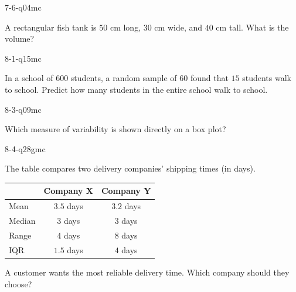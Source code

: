 \begin{practiceQuestion}{7-6-q04}{mc}
\begin{questionText}
A rectangular fish tank is $50$ cm long, $30$ cm wide, and $40$ cm tall. What is the volume?
\end{questionText}
\end{practiceQuestion}

\begin{practiceQuestion}{8-1-q15}{mc}
\begin{questionText}
In a school of $600$ students, a random sample of $60$ found that $15$ students walk to school. Predict how many students in the entire school walk to school.
\end{questionText}
\end{practiceQuestion}

\begin{practiceQuestion}{8-3-q09}{mc}
\begin{questionText}
Which measure of variability is shown directly on a box plot?
\end{questionText}
\end{practiceQuestion}

\begin{practiceQuestion}{8-4-q28}{gmc}
\begin{questionText}
The table compares two delivery companies' shipping times (in days).

\begin{center}
\begin{tabular}{|l|c|c|}
\hline
 & \textbf{Company X} & \textbf{Company Y} \\
\hline
Mean & $3.5$ days & $3.2$ days \\
\hline
Median & $3$ days & $3$ days \\
\hline
Range & $4$ days & $8$ days \\
\hline
IQR & $1.5$ days & $4$ days \\
\hline
\end{tabular}
\end{center}

A customer wants the most reliable delivery time. Which company should they choose?
\end{questionText}
\end{practiceQuestion}

